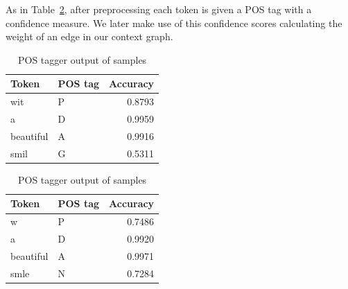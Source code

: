 \documentclass[preprint,review,12pt]{elsarticle}
\begin{document}
As in Table~\ref{tab:postags}, after preprocessing each token is given a POS tag with a confidence measure. We later make use of this confidence scores calculating the weight of an edge in our context graph.

\begin{table}[htbp]
\begin{minipage}{.5\linewidth}
\begin{tabular}[h]{|llr|}
 \hline
Token & POS tag & Accuracy \\
 \hline
wit & P & 0.8793 \\
 \hline
a & D & 0.9959 \\
 \hline
beautiful & A & 0.9916 \\
 \hline
smil & G & 0.5311 \\
 \hline
\end{tabular}
\end{minipage}
\begin{minipage}{.5\linewidth}
\begin{tabular}[h]{|llr|}
 \hline
Token & POS tag & Accuracy \\
 \hline
w & P & 0.7486 \\
 \hline
a & D & 0.9920 \\
 \hline
beautiful & A & 0.9971 \\
 \hline
smle & N & 0.7284 \\
 \hline
\end{tabular}
\end{minipage}
\caption{POS tagger output of samples}
\label{tab:postags}
\end{table}







\end{document}
